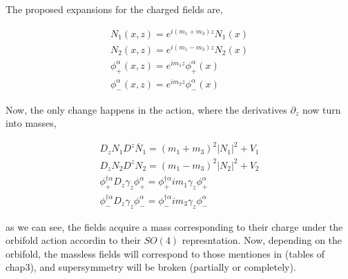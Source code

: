The proposed expansions for the charged fields are,

\begin{equation}
    \begin{aligned}
        N_1(x, z) = e^{i(m_1 + m_3)z} N_1(x) \\
        N_2(x, z) = e^{i(m_1 - m_3)z} N_2(x) \\
        \phi_+^\alpha (x, z) = e^{im_1 z} \phi_+^\alpha(x)\\
        \phi_-^\alpha (x, z) = e^{im_2 z} \phi_-^\alpha(x)
    \end{aligned}
\end{equation}

Now, the only change happens in the action, where the derivatives $\partial_z$ now turn into masses,

\begin{equation}
    \begin{aligned}
        D_z N_1 D^z \overline{N}_1 = (m_1 + m_3)^2 |N_1|^2 + V_1\\
        D_z N_2 D^z N_2 = (m_1 - m_3)^2 |N_2|^2 + V_2 \\
        \phi_+^{\dagger \alpha} D_z \gamma_z \phi_+^\alpha = \phi_+^{\dagger \alpha} im_1 \gamma_z \phi_+^\alpha\\
        \phi_-^{\dagger \alpha} D_z \gamma_z \phi_-^\alpha = \phi_-^{\dagger \alpha} im_3 \gamma_z \phi_-^\alpha
    \end{aligned}
\end{equation}

as we can see, the fields acquire a mass corresponding to their charge under the orbifold action accordin to their $SO(4)$ represntation. Now, depending on the orbifold, the massless fields will correspond to those mentiones in (tables of chap3), and supersymmetry will be broken (partially or completely).